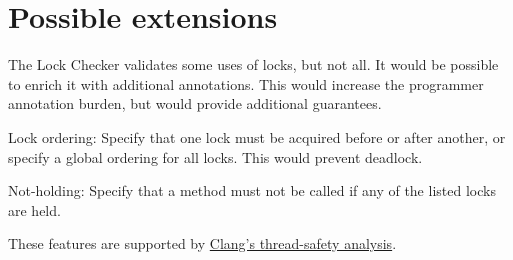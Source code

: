 

\section{Possible extensions\label{lock-extensions}}

The Lock Checker validates some uses of locks, but not all.  It would be
possible to enrich it with additional annotations.  This would increase the
programmer annotation burden, but would provide additional guarantees.

Lock ordering:  Specify that one lock must be acquired before or after
another, or specify a global ordering for all locks.  This would prevent
deadlock.

Not-holding:  Specify that a method must not be called if any of the listed
locks are held.

These features are supported by
\href{http://clang.llvm.org/docs/ThreadSafetyAnalysis.html}{Clang's
  thread-safety analysis}.


